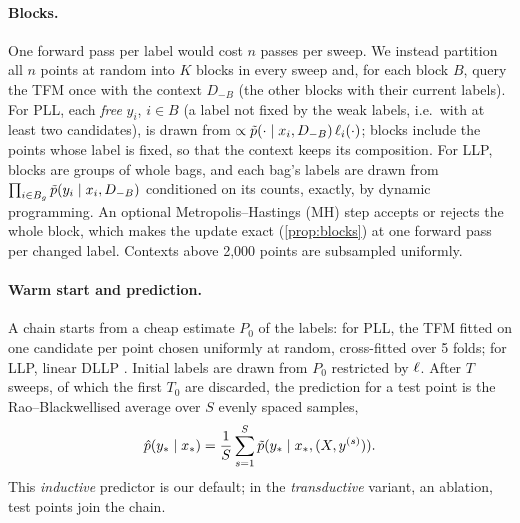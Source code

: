 \paragraph{Blocks.} One forward pass per label would cost $n$ passes per sweep. We instead partition all $n$ points at
random into $K$ blocks in every sweep and, for each block $B$, query the TFM once with the context $D_{-B}$ (the other
blocks with their current labels). For PLL, each \emph{free} $y_i$, $i\in B$ (a label not fixed by the weak labels, i.e.\ with at least two
candidates), is drawn from
$\propto\tilde p(\cdot\mid x_i,D_{-B})\,\ell_i(\cdot)$; blocks include the points whose label is fixed, so that the context
keeps its composition. For LLP, blocks are groups of whole bags, and each bag's labels are drawn from
$\prod_{i\in B_g}\tilde p(y_i\mid x_i,D_{-B})$ conditioned on its counts, exactly, by dynamic programming. An optional
Metropolis--Hastings (MH) step accepts or rejects the whole block, which makes the update exact (\cref{prop:blocks}) at
one forward pass per changed label. Contexts above 2{,}000 points are subsampled uniformly.

\paragraph{Warm start and prediction.} A chain starts from a cheap estimate $P_0$ of the labels: for PLL, the TFM fitted
on one candidate per point chosen uniformly at random, cross-fitted over 5 folds; for LLP, linear DLLP
\citep{dllp}. Initial labels are drawn from $P_0$ restricted by $\ell$.
After $T$ sweeps, of which the first $T_0$ are discarded, the prediction for a test point is the Rao--Blackwellised
average over $S$ evenly spaced samples,
\begin{equation}\label{eq:predict}
  \hat p(y_*\mid x_*)=\frac1S\sum_{s=1}^S\tilde p(y_*\mid x_*,(X,y^{(s)})).
\end{equation}
This \emph{inductive} predictor is our default; in the \emph{transductive} variant, an ablation, test points join the chain.

